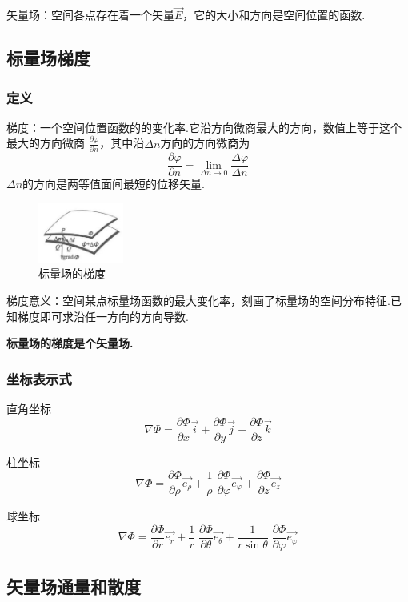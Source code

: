 \documentclass[12pt, UTF8, AutoFakeBold]{ctexart} %
\begin{document}
矢量场：空间各点存在着一个矢量$\vec{E}$，它的大小和方向是空间位置的函数.

\subsection{标量场梯度}
\subsubsection{定义}
梯度：一个空间位置函数的的变化率.它沿方向微商最大的方向，数值上等于这个最大的方向微商
$\frac{\partial \varphi}{\partial n}$，其中沿$\Delta n$方向的方向微商为
\[
    \frac{\partial \varphi}{\partial n} = \lim_{\Delta n \to 0}\frac{\Delta \varphi}{\Delta n}
\]
$\Delta n$的方向是两等值面间最短的位移矢量.

\begin{figure}[htbp]
    \centering
    \includegraphics[width=0.25\textwidth]{images/标量场的梯度.png}
    \caption{标量场的梯度}
\end{figure}

梯度意义：空间某点标量场函数的最大变化率，刻画了标量场的空间分布特征.已知梯度即可求沿任一方向的方向导数.

\textbf{标量场的梯度是个矢量场.}
\subsubsection{坐标表示式}
直角坐标
\[
    \nabla\varPhi = \frac{\partial\varPhi}{\partial x}\vec{i}
    + \frac{\partial\varPhi}{\partial y}\vec{j}
    + \frac{\partial\varPhi}{\partial z}\vec{k}
\]

柱坐标
\[
    \nabla\varPhi = \frac{\partial\varPhi}{\partial\rho}\vec{e_\rho}
    + \frac{1}{\rho} \; \frac{\partial\varPhi}{\partial\varphi}\vec{e_\varphi}
    + \frac{\partial\varPhi}{\partial z}\vec{e_z}
\]

球坐标
\[
    \nabla\varPhi = \frac{\partial\varPhi}{\partial r}\vec{e_r}
    + \frac{1}{r} \; \frac{\partial\varPhi}{\partial\theta}\vec{e_\theta}
    + \frac{1}{r\sin\theta} \; \frac{\partial\varPhi}{\partial\varphi}\vec{e_\varphi}
\]

\subsection{矢量场通量和散度}
\end{document}
